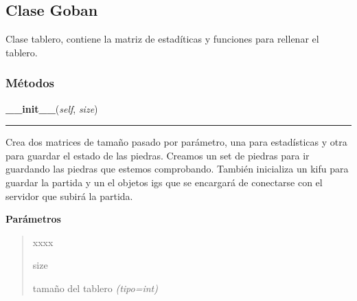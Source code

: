 
\subsection{Clase Goban}

    \label{src:goban:Goban}

Clase tablero, contiene la matriz de estadíticas y funciones para rellenar el tablero.


  \subsubsection{Métodos}

    \label{src:goban:Goban:__init__}

    \vspace{0.5ex}

\hspace{.8\funcindent}\begin{boxedminipage}{\funcwidth}

    \raggedright \textbf{\_\_init\_\_}(\textit{self}, \textit{size})

    \vspace{-1.5ex}

    \rule{\textwidth}{0.5\fboxrule}
\setlength{\parskip}{2ex}
Crea dos matrices de tamaño pasado por parámetro, una para estadísticas y otra para guardar el estado de las piedras. Creamos un set de piedras para ir guardando las piedras que estemos comprobando.  También inicializa un kifu para guardar la partida y un el objetos igs que se encargará de conectarse con el servidor que subirá la partida.

\setlength{\parskip}{1ex}
      \textbf{Parámetros}
      \vspace{-1ex}

      \begin{quote}
        \begin{Ventry}{xxxx}

          \item[size]


tamaño del tablero
            {\it (tipo=int)}

        \end{Ventry}

      \end{quote}

    \end{boxedminipage}

